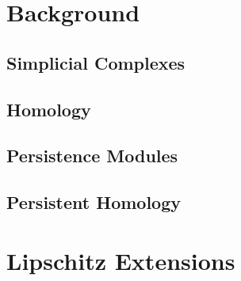 \documentclass[11pt]{article}
\title{}
\author{}
\date{}
\begin{document}
\section{Background}
\subsection{Simplicial Complexes}

\subsection{Homology}

\subsection{Persistence Modules}

\subsection{Persistent Homology}


\section{Lipschitz Extensions}




\end{document}
